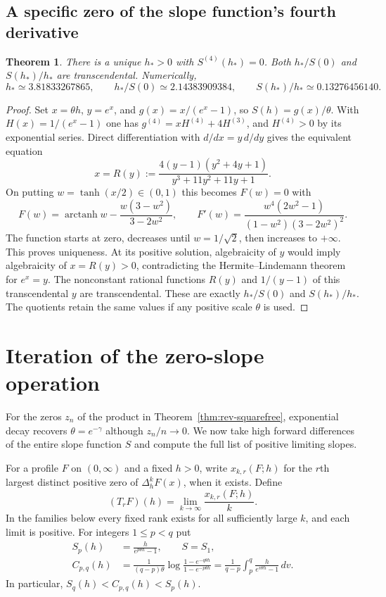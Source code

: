\documentclass[11pt,a4paper]{article}
\newtheorem{theorem}{Theorem}[section]
\theoremstyle{definition}\newtheorem{definition}[theorem]{Definition}\newtheorem{example}[theorem]{Example}
\theoremstyle{remark}\newtheorem{remark}[theorem]{Remark}
\begin{document}
\subsection{A specific zero of the slope function's fourth derivative}
\begin{theorem}\label{thm:rev-fourth}
There is a unique $h_*>0$ with $S^{(4)}(h_*)=0$. Both $h_*/S(0)$ and $S(h_*)/h_*$ are transcendental. Numerically,
\[
 h_*\simeq3.81833267865,\qquad h_*/S(0)\simeq2.14383909384,
 \qquad S(h_*)/h_*\simeq0.13276456140 .
\]
\end{theorem}
\begin{proof}
Set $x=\theta h$, $y=e^x$, and $g(x)=x/(e^x-1)$, so $S(h)=g(x)/\theta$.
With $H(x)=1/(e^x-1)$ one has $g^{(4)}=xH^{(4)}+4H^{(3)}$, and $H^{(4)}>0$ by its exponential series. Direct differentiation with $d/dx=y\,d/dy$ gives the equivalent equation
\[
 x=R(y):=
 \frac{4(y-1)(y^2+4y+1)}{y^3+11y^2+11y+1}.
\]
On putting $w=\tanh(x/2)\in(0,1)$ this becomes $F(w)=0$ with
\[
 F(w)=\operatorname{arctanh}w-\frac{w(3-w^2)}{3-2w^2},
 \qquad F'(w)=\frac{w^4(2w^2-1)}{(1-w^2)(3-2w^2)^2}.
\]
The function starts at zero, decreases until $w=1/\sqrt2$, then increases to $+\infty$. This proves uniqueness. At its positive solution, algebraicity of $y$ would imply algebraicity of $x=R(y)>0$, contradicting the Hermite--Lindemann theorem for $e^x=y$. The nonconstant rational functions $R(y)$ and $1/(y-1)$ of this transcendental $y$ are transcendental. These are exactly $h_*/S(0)$ and $S(h_*)/h_*$. The quotients retain the same values if any positive scale $\theta$ is used.
\end{proof}

\section{Iteration of the zero-slope operation}\label{sec:rev-branches}

For the zeros $z_n$ of the product in Theorem~\ref{thm:rev-squarefree}, exponential decay recovers $\theta=e^{-\gamma}$ although $z_n/n\to0$. We now take high forward differences of the entire slope function $S$ and compute the full list of positive limiting slopes.

For a profile $F$ on $(0,\infty)$ and a fixed $h>0$, write $x_{k,r}(F;h)$ for the $r$th largest distinct positive zero of $\Delta_h^k F(x)$, when it exists. Define
\[
 (T_r F)(h)=\lim_{k\to\infty}\frac{x_{k,r}(F;h)}{k}.
\]
In the families below every fixed rank exists for all sufficiently large $k$, and each limit is positive. For integers $1\le p<q$ put
\begin{align*}
 S_p(h)&=\frac{h}{e^{p\theta h}-1},\qquad S=S_1,\\
 C_{p,q}(h)&=\frac{1}{(q-p)\theta}
       \log\frac{1-e^{-q\theta h}}{1-e^{-p\theta h}}
       =\frac{1}{q-p}\int_p^q\frac{h}{e^{v\theta h}-1}\,dv .
\end{align*}
In particular, $S_q(h)<C_{p,q}(h)<S_p(h)$.
\end{document}
